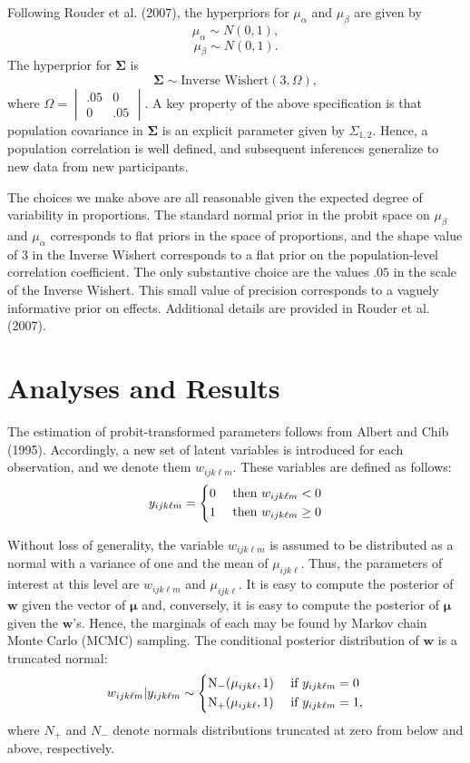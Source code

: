 \documentclass[english,man]{apa6}
\begin{document}
Following Rouder et al. (2007), the hyperpriors for \(\mu_{\alpha}\) and
\(\mu_{\beta}\) are given by \[\mu_{\alpha} \sim N(0,1),\]
\[ \mu_{\beta} \sim N(0,1). \] The hyperprior for
\(\boldsymbol{\Sigma}\) is
\[\boldsymbol{\Sigma} \sim \mbox{Inverse Wishert}(3,\Omega),\] where
\(\Omega = \begin{vmatrix}.05 & 0 \\ 0 & .05 \end{vmatrix}\). A key
property of the above specification is that population covariance in
\(\boldsymbol{\Sigma}\) is an explicit parameter given by
\(\Sigma_{1,2}\). Hence, a population correlation is well defined, and
subsequent inferences generalize to new data from new participants.

The choices we make above are all reasonable given the expected degree
of variability in proportions. The standard normal prior in the probit
space on \(\mu_{\beta}\) and \(\mu_{\alpha}\) corresponds to flat priors
in the space of proportions, and the shape value of \(3\) in the Inverse
Wishert corresponds to a flat prior on the population-level correlation
coefficient. The only substantive choice are the values \(.05\) in the
scale of the Inverse Wishert. This small value of precision corresponds
to a vaguely informative prior on effects. Additional details are
provided in Rouder et al. (2007).

\section{Analyses and Results}\label{analyses-and-results}

The estimation of probit-transformed parameters follows from Albert and
Chib (1995). Accordingly, a new set of latent variables is introduced
for each observation, and we denote them \(w_{ijk\ell m}\). These
variables are defined as follows: \[y_{ijk\ell m}=
  \begin{dcases}
      0 & \text{ then }  w_{ijk\ell m} < 0 \\ 
      1  & \text{ then }  w_{ijk\ell m} \geq 0
  \end{dcases}
\]

Without loss of generality, the variable \(w_{ijk\ell m}\) is assumed to
be distributed as a normal with a variance of one and the mean of
\(\mu_{ijk\ell}\). Thus, the parameters of interest at this level are
\(w_{ijk\ell m}\) and \(\mu_{ijk\ell}\). It is easy to compute the
posterior of \(\boldsymbol{w}\) given the vector of \(\boldsymbol{\mu}\)
and, conversely, it is easy to compute the posterior of
\(\boldsymbol{\mu}\) given the \(\boldsymbol{w}\)'s. Hence, the
marginals of each may be found by Markov chain Monte Carlo (MCMC)
sampling. The conditional posterior distribution of \(\boldsymbol{w}\)
is a truncated normal: \[w_{ijk\ell m}|y_{ijk\ell m} \sim 
  \begin{dcases} 
    \text{N}_-(\mu_{ijk\ell},1) & \text{ if }  y_{ijk\ell m}=0 \\
    \text{N}_+(\mu_{ijk\ell},1) & \text{ if }  y_{ijk\ell m}=1, 
  \end{dcases}
\] where \(N_+\) and \(N_-\) denote normals distributions truncated at
zero from below and above, respectively.
\end{document}
